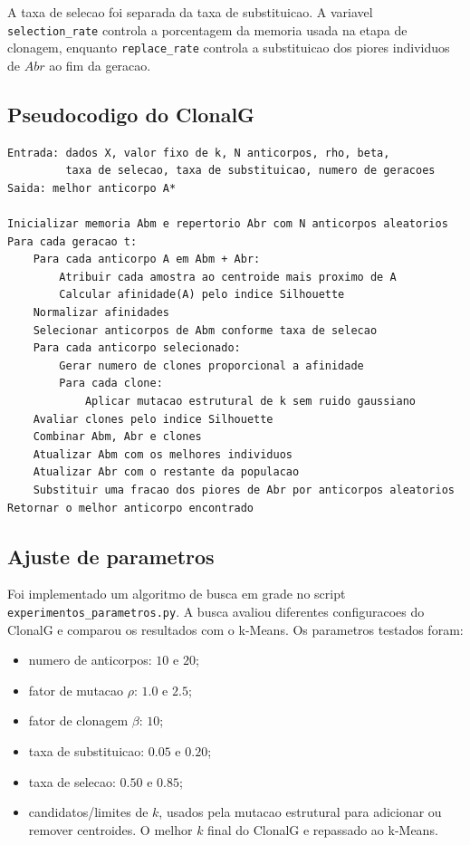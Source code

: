 \documentclass[12pt,a4paper]{article}
\begin{document}
A taxa de selecao foi separada da taxa de substituicao. A variavel \texttt{selection\_rate} controla a porcentagem da memoria usada na etapa de clonagem, enquanto \texttt{replace\_rate} controla a substituicao dos piores individuos de \(Abr\) ao fim da geracao.

\subsection{Pseudocodigo do ClonalG}
\begin{verbatim}
Entrada: dados X, valor fixo de k, N anticorpos, rho, beta,
         taxa de selecao, taxa de substituicao, numero de geracoes
Saida: melhor anticorpo A*

Inicializar memoria Abm e repertorio Abr com N anticorpos aleatorios
Para cada geracao t:
    Para cada anticorpo A em Abm + Abr:
        Atribuir cada amostra ao centroide mais proximo de A
        Calcular afinidade(A) pelo indice Silhouette
    Normalizar afinidades
    Selecionar anticorpos de Abm conforme taxa de selecao
    Para cada anticorpo selecionado:
        Gerar numero de clones proporcional a afinidade
        Para cada clone:
            Aplicar mutacao estrutural de k sem ruido gaussiano
    Avaliar clones pelo indice Silhouette
    Combinar Abm, Abr e clones
    Atualizar Abm com os melhores individuos
    Atualizar Abr com o restante da populacao
    Substituir uma fracao dos piores de Abr por anticorpos aleatorios
Retornar o melhor anticorpo encontrado
\end{verbatim}

\subsection{Ajuste de parametros}
Foi implementado um algoritmo de busca em grade no script \texttt{experimentos\_parametros.py}. A busca avaliou diferentes configuracoes do ClonalG e comparou os resultados com o k-Means. Os parametros testados foram:

\begin{itemize}
    \item numero de anticorpos: \(10\) e \(20\);
    \item fator de mutacao \(\rho\): \(1.0\) e \(2.5\);
    \item fator de clonagem \(\beta\): \(10\);
    \item taxa de substituicao: \(0.05\) e \(0.20\);
    \item taxa de selecao: \(0.50\) e \(0.85\);
    \item candidatos/limites de \(k\), usados pela mutacao estrutural para adicionar ou remover centroides. O melhor \(k\) final do ClonalG e repassado ao k-Means.
\end{itemize}
\end{document}

